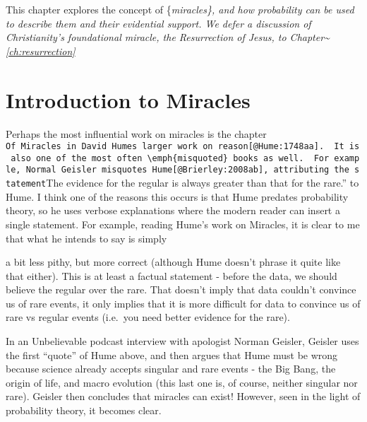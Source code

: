 \documentclass{tufte-book}
\begin{document}



This chapter explores the concept of \{\em miracles\}, and how
probability can be used to describe them and their evidential support.
We defer a discussion of Christianity's foundational miracle, the
Resurrection of Jesus, to Chapter\textasciitilde{}\ref{ch:resurrection}

\section{Introduction to Miracles}\label{introduction-to-miracles}

Perhaps the most influential work on miracles is the chapter
\texttt{Of\ Miracles\textquotesingle{}\textquotesingle{}\ in\ David\ Hume\textquotesingle{}s\ larger\ work\ on\ reason{[}@Hume:1748aa{]}.\ \ It\ is\ also\ one\ of\ the\ most\ often\ \textbackslash{}emph\{misquoted\}\ books\ as\ well.\ \ For\ example,\ Normal\ Geisler\ misquotes\ Hume{[}@Brierley:2008ab{]},\ attributing\ the\ statement}The
evidence for the regular is always greater than that for the rare.'' to
Hume. I think one of the reasons this occurs is that Hume predates
probability theory, so he uses verbose explanations where the modern
reader can insert a single statement. For example, reading Hume's work
on Miracles, it is clear to me that what he intends to say is simply


a bit less pithy, but more correct (although Hume doesn't phrase it
quite like that either). This is at least a factual statement - before
the data, we should believe the regular over the rare. That doesn't
imply that data couldn't convince us of rare events, it only implies
that it is more difficult for data to convince us of rare vs regular
events (i.e.~you need better evidence for the rare).

In an Unbelievable podcast interview with apologist Norman
Geisler\citep{Brierley:2008ab}, Geisler uses the first ``quote'' of Hume
above, and then argues that Hume must be wrong because science already
accepts singular and rare events - the Big Bang, the origin of life, and
macro evolution (this last one is, of course, neither singular nor
rare). Geisler then concludes that miracles can exist! However, seen in
the light of probability theory, it becomes clear.
\end{document}
